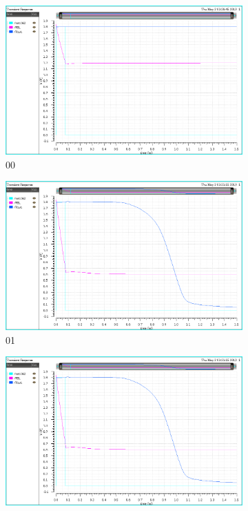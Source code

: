\begin{figure}[H]
\begin{center}
\begin{subfigure}{0.4\textwidth}
\includegraphics[width=\textwidth]{nor00.png}
\caption{00}
\end{subfigure}
\begin{subfigure}{0.4\textwidth}
\includegraphics[width=\textwidth]{nor01.png}
\caption{01}
\end{subfigure}
\begin{subfigure}{0.4\textwidth}
\includegraphics[width=\textwidth]{nor10.png}

\end{subfigure}
\end{center}
\end{figure}
